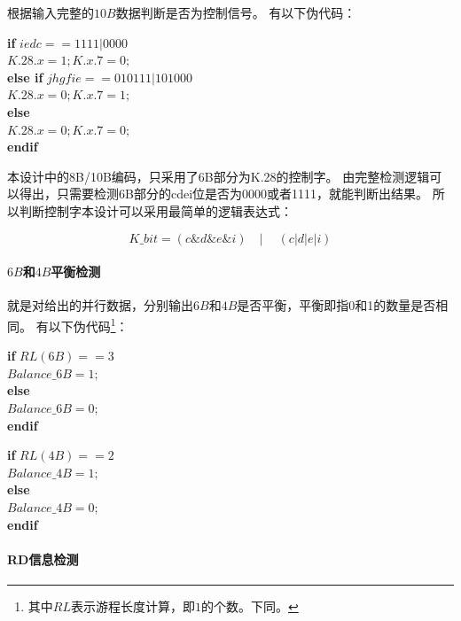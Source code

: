 \documentclass[UTF8]{ctexart}
\newcommand\kw{\textbf}
\begin{document}
根据输入完整的$10B$数据判断是否为控制信号。
有以下伪代码：

\begin{tabbing}
\qquad\=\kw{if} $iedc==1111|0000$ \\
      \>\qquad$K.28.x=1;K.x.7=0;$ \\
      \>\kw{else if} $jhgfie==010111|101000$ \\
      \>\qquad$K.28.x=0;K.x.7=1;$ \\
      \>\kw{else} \\
      \>\qquad$K.28.x=0;K.x.7=0;$ \\
      \>\kw{endif}
\end{tabbing}

本设计中的8B/10B编码，只采用了6B部分为K.28的控制字。
由完整检测逻辑可以得出，只需要检测6B部分的cdei位是否为0000或者1111，就能判断出结果。
所以判断控制字本设计可以采用最简单的逻辑表达式：

$$K\_bit = (c \& d \& e \& i)\quad|\quad~(c | d | e | i)$$

\paragraph{$6B$和$4B$平衡检测}

就是对给出的并行数据，分别输出$6B$和$4B$是否平衡，平衡即指0和1的数量是否相同。
有以下伪代码\footnote{其中$RL$表示游程长度计算，即$1$的个数。下同。}：

\begin{tabbing}
\qquad\=\kw{if} $RL(6B)==3$ \\
      \>\qquad$Balance\_6B=1;$ \\
      \>\kw{else} \\
      \>\qquad$Balance\_6B=0;$ \\
      \>\kw{endif}
\end{tabbing}

\begin{tabbing}
\qquad\=\kw{if} $RL(4B)==2$ \\
      \>\qquad$Balance\_4B=1;$ \\
      \>\kw{else} \\
      \>\qquad$Balance\_4B=0;$ \\
      \>\kw{endif}
\end{tabbing}

\paragraph{RD信息检测}
\end{document}
